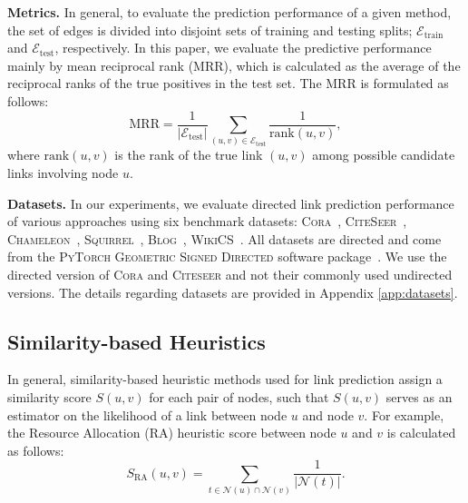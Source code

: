 \documentclass{article}
\begin{document}
\textbf{Metrics.} In general, to evaluate the prediction performance of a given method, the set of edges is divided into disjoint sets of training  and testing splits; $\mathcal{E}_{\operatorname{train}}$ and $\mathcal{E}_{\operatorname{test}}$, respectively. In this paper, we evaluate the predictive performance mainly by mean reciprocal rank (MRR), which is calculated as the average of the reciprocal ranks of the true positives in the test set. The MRR is formulated as follows:
\begin{equation}\label{eq:mrr}
\text{MRR} = \frac{1}{|\mathcal{E}_{\operatorname{test}}|} \sum_{(u,v) \in \mathcal{E}_{\operatorname{test}}} \frac{1}{\text{rank}(u,v)},
\end{equation}
where $\text{rank}(u,v)$ is the rank of the true link $(u,v)$ among possible candidate links involving node $u$.

\textbf{Datasets.} In our experiments, we evaluate directed link prediction performance of various approaches using six benchmark datasets: \textsc{Cora}~\citep{yang2016revisiting}, \textsc{CiteSeer}~\citep{yang2016revisiting}, \textsc{Chameleon}~\citep{rozemberczki2021multiscale}, \textsc{Squirrel}~\citep{rozemberczki2021multiscale}, \textsc{Blog}~\citep{he2022digrac}, \textsc{WikiCS}~\citep{mernyei2020wikics}. All datasets are directed and come from the \textsc{PyTorch Geometric Signed Directed} software package~\citep{he2024pytorch}. We use the directed version of \textsc{Cora} and \textsc{Citeseer} and not their commonly used undirected versions. The details regarding datasets are provided in Appendix \ref{app:datasets}. 

\subsection{Similarity-based Heuristics}
In general, similarity-based heuristic methods used for link prediction assign a similarity score $S(u, v)$ for each pair of nodes, such that $S(u, v)$ serves as an estimator on the likelihood of a link between node $u$ and node $v$. For example, the Resource Allocation (RA) heuristic score between node $u$ and $v$ is calculated as follows:
\begin{equation}
    S_{\operatorname{RA}}(u, v) = \sum_{t \in \mathcal{N}(u) \cap \mathcal{N}(v)}\frac{1}{|\mathcal{N}(t)|}.
\end{equation}
\end{document}
